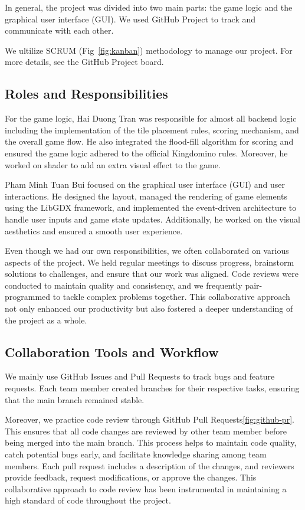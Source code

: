 \documentclass[conference]{IEEEtran}
\begin{document}
In general, the project was divided into two main parts: the game logic and the
graphical user interface (GUI). We used GitHub Project to track and communicate
with each other.

We ultilize SCRUM (Fig~\ref{fig:kanban}) methodology to manage our project. For
more details, see the GitHub Project board.

\subsection{Roles and Responsibilities}
For the game logic, Hai Duong Tran was responsible for almost all backend logic
including the implementation of the tile placement rules, scoring mechanism,
and the overall game flow. He also integrated the flood-fill algorithm for
scoring and ensured the game logic adhered to the official Kingdomino rules.
Moreover, he worked on shader to add an extra visual effect to the game.

Pham Minh Tuan Bui focused on the graphical user interface (GUI) and user
interactions. He designed the layout, managed the rendering of game elements
using the LibGDX framework, and implemented the event-driven architecture to
handle user inputs and game state updates. Additionally, he worked on the
visual aesthetics and ensured a smooth user experience.

Even though we had our own responsibilities, we often collaborated on various
aspects of the project. We held regular meetings to discuss progress,
brainstorm solutions to challenges, and ensure that our work was aligned. Code
reviews were conducted to maintain quality and consistency, and we frequently
pair-programmed to tackle complex problems together. This collaborative
approach not only enhanced our productivity but also fostered a deeper
understanding of the project as a whole.

\subsection{Collaboration Tools and Workflow}

We mainly use GitHub Issues and Pull Requests to track bugs and feature
requests. Each team member created branches for their respective tasks,
ensuring that the main branch remained stable.

Moreover, we practice code review through GitHub Pull
Requests\ref{fig:github-pr}. This ensures that all code changes are reviewed by
other team member before being merged into the main branch. This process helps
to maintain code quality, catch potential bugs early, and facilitate knowledge
sharing among team members. Each pull request includes a description of the
changes, and reviewers provide feedback, request modifications, or approve the
changes. This collaborative approach to code review has been instrumental in
maintaining a high standard of code throughout the project.
\end{document}
